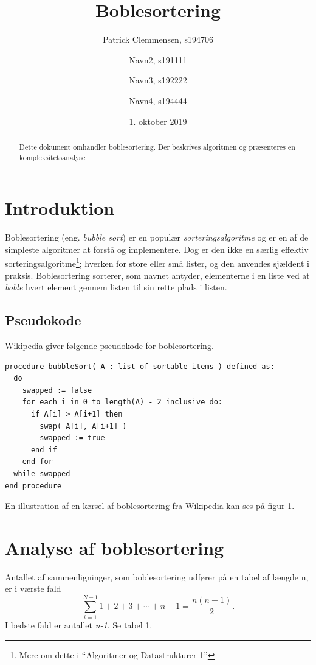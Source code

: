 \documentclass{article}
\title{\huge Boblesortering}
\author{Patrick Clemmensen, s194706 \and Navn2, s191111 \and Navn3, s192222 \and Navn4, s194444}
\date{1. oktober 2019}
\begin{document}
\maketitle



\begin{abstract}
Dette dokument omhandler boblesortering. Der beskrives algoritmen og præsenteres en kompleksitetsanalyse
\end{abstract}

\section{Introduktion}
Boblesortering (eng. \textit{bubble sort}) er en populær \textit{sorteringsalgoritme} og er en af de simpleste algoritmer at forstå og implementere. Dog er den ikke en særlig effektiv sorteringsalgoritme\footnote[1]{Mere om dette i “Algoritmer og Datastrukturer 1”}; hverken for store eller små lister, og den anvendes sjældent i praksis. Boblesortering sorterer, som navnet antyder, elementerne i en liste ved at \textit{boble} hvert element gennem listen til sin rette plads i listen.

\subsection{Pseudokode}
Wikipedia {\cite{2}} giver følgende pseudokode for boblesortering.

\begin{verbatim}
procedure bubbleSort( A : list of sortable items ) defined as:
  do
    swapped := false
    for each i in 0 to length(A) - 2 inclusive do:
      if A[i] > A[i+1] then
        swap( A[i], A[i+1] )
        swapped := true
      end if
    end for
  while swapped
end procedure
\end{verbatim}
En illustration af en kørsel af boblesortering fra Wikipedia kan ses på figur 1.


\section{Analyse af boblesortering}
Antallet af sammenligninger, som boblesortering udfører på en tabel af længde n, er i værste fald
\begin{equation}
  \sum \limits_{i = 1}^{N-1} 1+2+3+\cdots+n-1 = \frac{n(n-1)}{2}.
\end{equation}
I bedste fald er antallet \textit{n-1}. Se tabel 1.
\newpage
\end{document}
